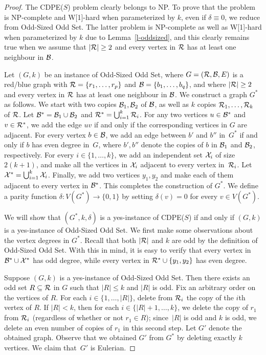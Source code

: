 \documentclass[11pt]{llncs}
\newcommand{\cdpe}{{\sc CDPE}}
\newcommand{\NP}{{\sf NP}}
\newcommand{\W}{{\sf W[1]}}
\begin{document}
\begin{proof}
The \cdpe($S$) problem clearly belongs to \NP. To prove that the problem
is \NP-complete and \W-hard when parameterized by $k$, even if
$\delta\equiv 0$, we reduce from {\sc Odd-Sized Odd Set}. The latter problem is
\NP-complete as well as \W-hard when parameterized by $k$ due to
Lemma~\ref{l-oddsized}, and this clearly remains true when we assume that
$|{\cal R}|\geq 2$ and every vertex in ${\cal R}$ has at least one neighbour in
${\cal B}$.

\begin{sloppypar}
Let $(G,k)$ be an instance of {\sc Odd-Sized Odd Set}, where $G=({\cal R},{\cal
B},E)$ is a red/blue graph with ${\cal R}=\{r_1,\ldots,r_p\}$ and ${\cal
B}=\{b_1,\ldots,b_q\}$, and where $|{\cal R}|\geq 2$ and every vertex in ${\cal
R}$ has at least one neighbour in ${\cal B}$. We construct a graph $G^*$ as
follows. We start with two copies ${\cal B}_1,{\cal B}_2$ of ${\cal B}$, as
well as $k$ copies ${\cal R}_1,\ldots,{\cal R}_k$ of ${\cal R}$. Let ${\cal
B}^*={\cal B}_1\cup {\cal B}_2$ and ${\cal R}^*=\bigcup_{i=1}^k {\cal R}_i$.
For any two vertices $u\in {\cal B}^*$ and $v\in {\cal R}^*$, we add the edge
$uv$ if and only if the corresponding vertices in $G$ are adjacent. For every
vertex $b\in {\cal B}$, we add an edge between $b'$ and $b''$ in~$G^*$ if and
only if $b$ has even degree in~$G$, where $b',b''$ denote the copies of $b$ in
${\cal B}_1$ and ${\cal B}_2$, respectively. For every $i\in \{1,\ldots,k\}$,
we add an independent set ${\cal X}_i$ 
of size $2(k+1)$, and make all the vertices in ${\cal X}_i$ adjacent to every
vertex in~${\cal R}_i$. Let ${\cal X}^*=\bigcup_{i=1}^k {\cal X}_i$. Finally,
we add two vertices $y_1,y_2$ and make each of them adjacent to every vertex in
${\cal B}^*$. This completes the construction of $G^*$. We define a parity
function $\delta: V(G^*)\rightarrow \{0,1\}$ by setting $\delta(v)=0$ for every
$v\in V(G^*)$.
\end{sloppypar}

We will show that $(G^*,k,\delta)$ is a yes-instance of \cdpe($S$) if and only
if $(G,k)$ is a yes-instance of {\sc Odd-Sized Odd Set}. We first make some
observations about the vertex degrees in $G^*$. Recall that both $|{\cal R}|$
and $k$ are odd by the definition of {\sc Odd-Sized Odd Set}. With this in
mind, it is easy to verify that every vertex in ${\cal B}^*\cup {\cal X}^*$ has
odd degree, while every vertex in ${\cal R}^*\cup \{y_1,y_2\}$ has even degree.

Suppose $(G,k)$ is a yes-instance of {\sc Odd-Sized Odd Set}. Then there exists
an odd set $R\subseteq {\cal R}$ in $G$ such that $|R|\leq k$ and $|R|$ is odd.
Fix an arbitrary order on the vertices of $R$. For each $i\in
\{1,\ldots,|R|\}$, delete from ${\cal R}_i$ the copy of the $i$th vertex of
$R$. If $|R|<k$, then for each $i\in \{|R|+1,\ldots,k\}$, we delete the copy of
$r_1$ from ${\cal R}_i$ (regardless of whether or not $r_1\in R$); since~$|R|$
is odd and $k$ is odd, we delete an even number of copies of $r_1$
in this second step. Let $G'$ denote the obtained graph. Observe that we
obtained $G'$ from $G^*$ by deleting exactly $k$ vertices. We claim that~$G'$
is Eulerian.


\end{proof}
\end{document}
